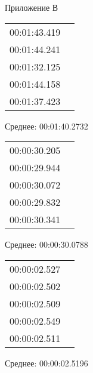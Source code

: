 \clearpage
\Large{Приложение В} \newline
\begin{table}[h]
\begin{tabular}{|cc|}
00:01:43.419 & \\
00:01:44.241  & \\
00:01:32.125  & \\
00:01:44.158  & \\
00:01:37.423  & \\
\end{tabular}
Среднее: 00:01:40.2732
\end{table}


\begin{table}[h]
\begin{tabular}{|cc|}
00:00:30.205 & \\
00:00:29.944  & \\
00:00:30.072  & \\
00:00:29.832  & \\
00:00:30.341  & \\
\end{tabular}
Среднее: 00:00:30.0788
\end{table}


\begin{table}[h]
\begin{tabular}{|cc|}
00:00:02.527 & \\
00:00:02.502  & \\
00:00:02.509  & \\
00:00:02.549  & \\
00:00:02.511  & \\
\end{tabular}
Среднее: 00:00:02.5196
\end{table}
